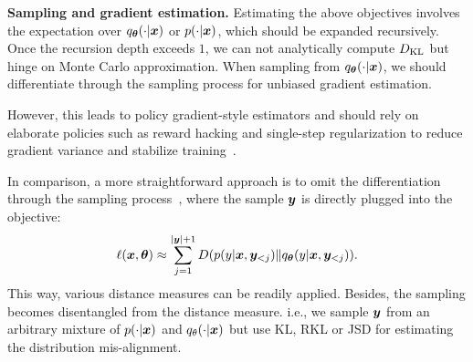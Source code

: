 \textbf{Sampling and gradient estimation.}
Estimating the above objectives involves the expectation over $q_{\bm{\theta}}(\cdot|{\bm{x}})$ or $p(\cdot|{\bm{x}})$, which should be expanded recursively. 
Once the recursion depth exceeds $1$, we can not analytically compute $D_{\mathrm{KL}}$ but hinge on Monte Carlo approximation. 
When sampling from $q_{\bm{\theta}}(\cdot|{\bm{x}})$, we should differentiate through the sampling process for unbiased gradient estimation. 

However, this leads to policy gradient-style estimators and should rely on elaborate policies such as reward hacking and single-step regularization to reduce gradient variance and stabilize training~\citep{gu2023knowledge}. 

In comparison, a more straightforward approach is to omit the differentiation through the sampling process~\citep{agarwal2023gkd}, where the sample ${\bm{y}}$ is directly plugged into the objective:
\begin{equation}
\label{eq:offline}
    \small
    \ell(\vx, \vtheta) \approx
 \sum_{j =1}^{|\vy|+1} D({p(y|\vx, \vy_{<j})} \Vert {q_\vtheta(y|\vx, \vy_{<j})} ).
\end{equation}
This way, various distance measures can be readily applied.
Besides, the sampling becomes disentangled from the distance measure. i.e., we sample ${\bm{y}}$ from an arbitrary mixture of ${p}(\cdot|{\bm{x}})$ and ${q}_\theta(\cdot|{\bm{x}})$ but use KL, RKL or JSD for estimating the distribution mis-alignment. 


